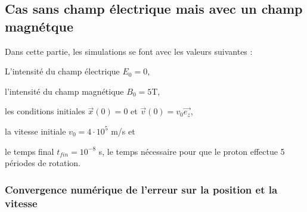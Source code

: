 \documentclass[a4paper,12pt,twoside]{article}
\begin{document}
	\subsection{Cas sans champ \'electrique mais avec un champ magn\'etque}
		Dans cette partie, les simulations se font avec les valeurs suivantes :
		
		L'intensit\'e du champ \'electrique $E_0=0$,
		
		l'intensit\'e du champ magn\'etique $B_0=5$T,
		
		les conditions initiales  $\vec{x}(0) = 0$ et $ \vec{v}(0) = v_0\vec{e_z}$,
		
		la vitesse initiale $v_0 = 4 \cdot 10^5$ m/s et 
	
		le temps final $t_{fin} = 10^{-8}$ s, le temps n\'ecessaire pour que le proton effectue 5 p\'eriodes de rotation.
		
		
		\subsubsection{Convergence num\'erique de l'erreur sur la position et la vitesse}
		
\end{document}
